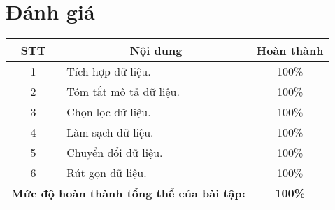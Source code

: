 \section{Đánh giá}

\begin{table}[H]\centering{}
\begin{tabular}{@{}clc@{}}
\toprule
\textbf{STT} & \multicolumn{1}{c}{\textbf{Nội dung}} & \textbf{Hoàn thành} \\ \midrule
1 &  Tích hợp dữ liệu. & 100\% \\
2 & Tóm tắt mô tả dữ liệu. & 100\% \\
3 & Chọn lọc dữ liệu. & 100\% \\
4 & Làm sạch dữ liệu. & 100\% \\
5 &  Chuyển đổi dữ liệu. & 100\% \\
6 &  Rút gọn dữ liệu. & 100\%\\\midrule
\multicolumn{2}{c}{\textbf{Mức độ hoàn thành tổng thể của bài tập:}} & \textbf{100\%} \\ \bottomrule
\end{tabular}
\end{table}

\newpage